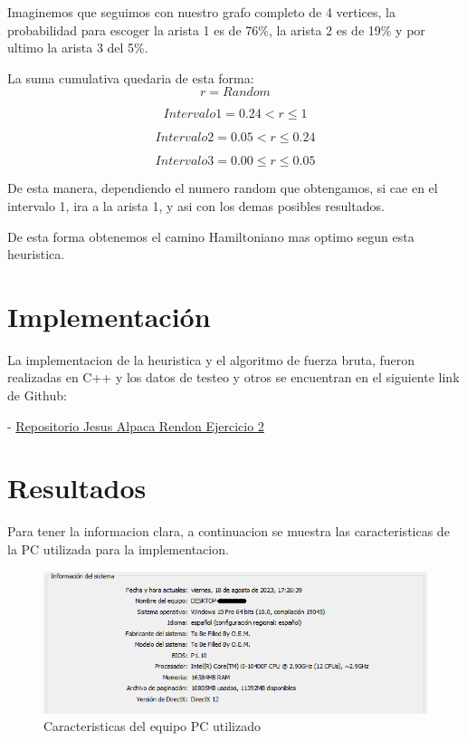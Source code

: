\documentclass[12pt]{article}
\begin{document}
Imaginemos que seguimos con nuestro grafo completo de 4 vertices, la probabilidad para escoger la arista 1 es de 76\%, la arista 2 es de 19\% y por ultimo
la arista 3 del 5\%.

La suma cumulativa quedaria de esta forma:
\vspace{15mm}
$$\textit{r} = Random$$

$$Intervalo 1 = {0.24 < \textit{r} \leq 1 }$$

$$Intervalo 2 = {0.05 < \textit{r} \leq 0.24 }$$

$$Intervalo 3 = {0.00 \leq \textit{r} \leq 0.05 }$$

De esta manera, dependiendo el numero random que obtengamos, si cae en el intervalo 1,
ira a la arista 1, y asi con los demas posibles resultados.

De esta forma obtenemos el camino Hamiltoniano mas optimo segun esta heuristica.

\section{Implementación}
La implementacion de la heuristica y el algoritmo de fuerza bruta, fueron realizadas en C++ y los datos de testeo y otros
se encuentran en el siguiente link de Github:

- \href{https://github.com/Alpha004/AyEDJAAR2023/tree/main/Ejercicio_2}{Repositorio Jesus Alpaca Rendon Ejercicio 2} 

\section{Resultados}

Para tener la informacion clara, a continuacion se muestra las caracteristicas de la PC utilizada para la implementacion.

\begin{figure}[H]
\centering
\includegraphics[width=\textwidth]{caracteristicas}
\caption{Caracteristicas del equipo PC utilizado}
\end{figure}
\end{document}

